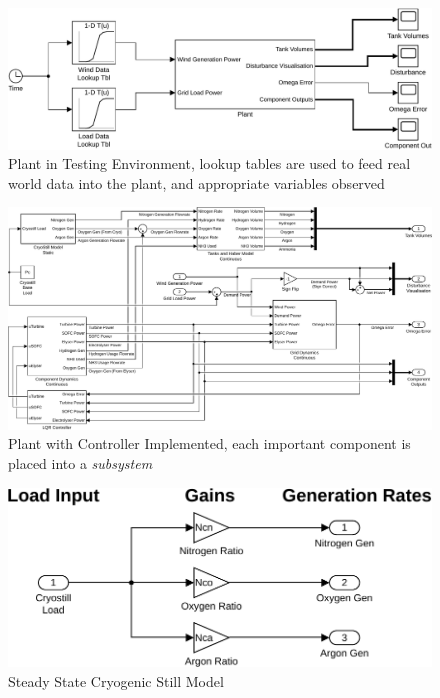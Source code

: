 \begin{figure}[p]
\centering
        \includegraphics[scale=0.7]{images/plant/global.pdf}
        \caption{Plant in Testing Environment, lookup tables are used to feed real world data into the plant, and appropriate variables observed}
        \label{fig:global}
\end{figure}
\begin{figure}[p]
\centering
        \includegraphics[scale=0.6]{images/plant2/plant.pdf}
    \caption{Plant with Controller Implemented, each important component is placed into a \emph{subsystem}}
        \label{fig:plant}
\end{figure}
\begin{figure}[p]
\centering
        \includegraphics[scale=0.7]{images/plant2/cryo.pdf}
    \caption{Steady State Cryogenic Still Model}
        \label{fig:cryo}
\end{figure}
